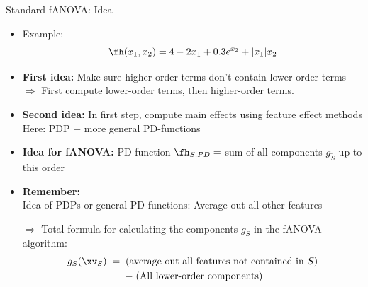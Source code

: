 \documentclass[11pt,compress,t,notes=noshow, aspectratio=169, xcolor=table]{beamer}
\begin{document}
    

\begin{frame}{Standard fANOVA: Idea}

    \begin{itemize}
        \item Example:
        \begin{equation*}
            \fh(x_1, x_2) = 4 - 2x_1 + 0.3 e^{x_2} + |x_1|x_2
        \end{equation*}
        \pause
        \item \textbf{First idea:} Make sure higher-order terms don't contain lower-order terms \\
        \(\Rightarrow\) First compute lower-order terms, then higher-order terms. \\
        \pause
        \item \textbf{Second idea:} In first step, compute main effects using feature effect methods \\
        Here: PDP + more general PD-functions
        \pause
        \item \textbf{Idea for fANOVA:} PD-function $\fh_{S;PD} =$ sum of all components $g_{\tilde{S}}$ up to this order
        \pause
        \item \textbf{Remember:} \\ Idea of PDPs or general PD-functions: Average out all other features
        \item[$\Rightarrow$] Total formula for calculating the components \(g_S\) in the fANOVA algorithm:
        \begin{multline*}
            g_{S} (\xv_S)
            \;=\; (\text{average out all features not contained in } S) \\
            \;-\; (\text{All lower-order components})
        \end{multline*}
    \end{itemize}


\end{frame}
\end{document}
